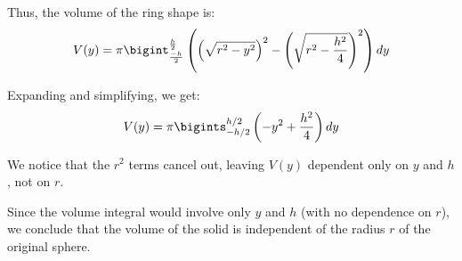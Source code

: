 \documentclass[12pt]{article}
\begin{document}
\begin{enumerate}[start=1,label={\bfseries. },leftmargin=1in]
    Thus, the volume of the ring shape is:
    \[
    V(y) = \pi \bigint_{\frac{-h}{2}}^{\frac{h}{2}}\left( \left( \sqrt{r^2 - y^2} \right)^2 - \left( \sqrt{r^2 - \frac{h^2}{4}} \right)^2 \right) dy
    \]

    Expanding and simplifying, we get:
    \[
    V(y) = \pi \bigints_{-h/2}^{h/2}\left( -y^2 + \frac{h^2}{4} \right) dy
    \]
    


    We notice that the \( r^2 \) terms cancel out, leaving \( V(y) \) dependent only on \( y \) and \( h \), not on \( r \). 

    Since the volume integral would involve only \( y \) and \( h \) (with no dependence on \( r \)), we conclude that the volume of the solid is independent of the radius \( r \) of the original sphere.

\end{enumerate}




    
\end{document}
